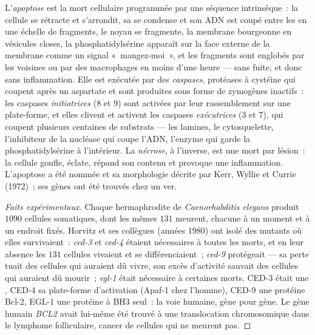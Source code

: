 \begin{definition}[L'apoptose]\label{def:b3:cell-cycle-apoptosis:apoptosis}
L'\emph{apoptose} est la mort cellulaire programmée par une séquence
intrinsèque~: la cellule se rétracte et s'arrondit, sa  se
condense et son ADN est coupé entre les  en une échelle de
fragments, le noyau se fragmente, la membrane bourgeonne en vésicules
closes, la phosphatidylsérine apparaît sur la face externe de la
membrane comme un signal «~mangez-moi~», et les fragments sont englobés
par les voisines ou par des macrophages en moins d'une heure --- sans
fuite, et donc sans inflammation. Elle est exécutée par des
\emph{caspases}, protéases à cystéine qui coupent après un aspartate et
sont produites sous forme de zymogènes inactifs~: les caspases
\emph{initiatrices} (8 et 9) sont activées par leur rassemblement sur
une plate-forme, et elles clivent et activent les caspases
\emph{exécutrices} (3 et 7), qui coupent plusieurs centaines de
substrats --- les lamines, le cytosquelette, l'inhibiteur de la
nucléase qui coupe l'ADN, l'enzyme qui garde la phosphatidylsérine à
l'intérieur. La \emph{nécrose}, à l'inverse, est une mort par lésion~:
la cellule gonfle, éclate, répand son contenu et provoque une
inflammation. L'apoptose a été nommée et sa morphologie décrite par
Kerr, Wyllie et Currie (1972)~; ses gènes ont été trouvés chez un ver.
\end{definition}

\begin{proof}[Faits expérimentaux]
Chaque hermaphrodite de \emph{Caenorhabditis elegans} produit $1090$
cellules somatiques, dont les mêmes $131$ meurent, chacune à un moment
et à un endroit fixés. Horvitz et ses collègues (années 1980) ont isolé
des mutants où elles survivaient~: \emph{ced-3} et \emph{ced-4} étaient
nécessaires à toutes les morts, et en leur absence les $131$ cellules
vivaient et se différenciaient~; \emph{ced-9} protégeait --- sa perte
tuait des cellules qui auraient dû vivre, son excès d'activité sauvait
des cellules qui auraient dû mourir~; \emph{egl-1} était nécessaire à
certaines morts. CED-3 était une , CED-4 sa plate-forme
d'activation (Apaf-1 chez l'homme), CED-9 une protéine Bcl-2, EGL-1 une
protéine à BH3 seul~: la voie humaine, gène pour gène. Le gène humain
\emph{BCL2} avait lui-même été trouvé à une translocation
chromosomique dans le lymphome folliculaire, cancer de cellules qui ne
meurent pas.
\end{proof}

